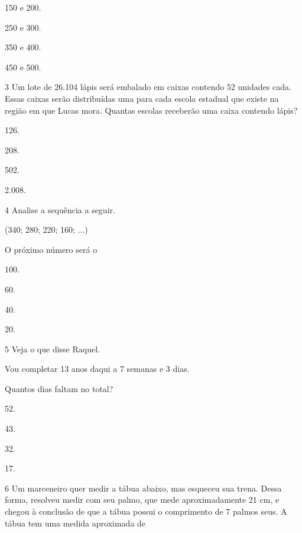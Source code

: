 \begin{mdframed}[linewidth=2pt,linecolor=salmao,roundcorner=2pt]
\begin{escolha}
{\begin{escolha}
\begin{escolha}
\item
  150 e 200.
\item
  250 e 300.
\item
  350 e 400.
\item
  450 e 500.
\end{escolha}

\num{3} Um lote de 26.104 lápis será embalado em caixas contendo 52 unidades cada. Essas caixas serão distribuídas uma para cada escola
estadual que existe na região em que Lucas mora. Quantas escolas
receberão uma caixa contendo lápis?

\begin{escolha}
\item
  126.
\item
  208.
\item
  502.
\item
  2.008.
\end{escolha}

\num{4} Analise a sequência a seguir.

\begin{mdframed}[linewidth=2pt,linecolor=azul!20,backgroundcolor=azul!20,roundcorner=2pt]
(340; 280; 220; 160; ...)
\end{mdframed}

 O próximo número será o

\begin{escolha}
\item
  100.
\item
  60.
\item
  40.
\item
  20.
\end{escolha}

\num{5} Veja o que disse Raquel.

\begin{mdframed}[linewidth=2pt,linecolor=azul!20,backgroundcolor=azul!20,roundcorner=2pt]
Vou completar 13 anos daqui a 7 semanas e 3 dias.
\end{mdframed}

Quantos dias faltam no total?

\begin{escolha}
\item
  52.
\item
  43.
\item
  32.
\item
  17.
\end{escolha}


\num{6} Um marceneiro quer medir a tábua abaixo, mas esqueceu sua trena. Dessa
forma, resolveu medir com seu palmo, que mede aproximadamente 21 cm, e
chegou à conclusão de que a tábua possui o comprimento
de 7 palmos seus. A tábua tem uma medida aproximada de


\end{escolha}}
\end{escolha}
\end{mdframed}
